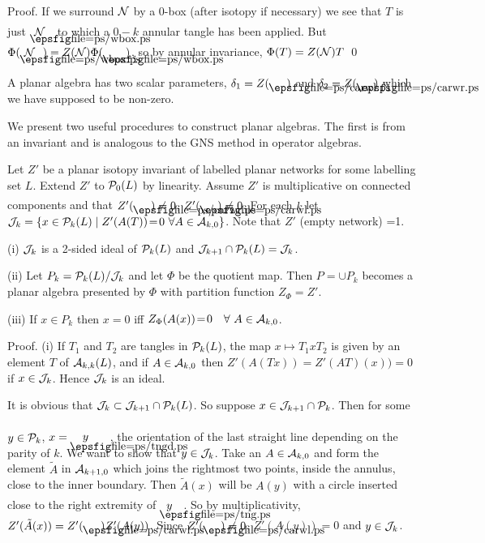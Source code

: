 \bs
{\sc Proof.} If we surround $\cal N$ by a 0-box (after isotopy
if necessary) we see that $T$ is just $\blankbox{\cal N}$ to which
a $0-k$ annular tangle has been applied. But
$\Phi( \blankbox{\cal N})=Z({\cal N})\Phi(\blankbox\ )$,
so by annular invariance, $\Phi(T)=Z({\cal N})T$ \qed

\bs
A planar algebra has two scalar parameters,
$\d_1=Z(\caleft\ )$ and $\d_2=Z(\caright\ )$
which we have supposed to be non-zero.



\bs We present two useful procedures to construct  planar algebras.
The first is from an invariant and is analogous to the GNS method
in operator algebras.

Let $Z'$ be a planar isotopy invariant of labelled planar networks
for some labelling set $L$. Extend $Z'$ to $\P_0(L)$ by linearity.
Assume $Z'$ is multiplicative on connected components and that
$Z'(\caright\ )\neq 0$, $Z'(\caleft\ )\neq 0$.
For each $k$ let ${\cal J}_k=\{x\in \P_k(L)\mid Z'(A(T))\!=\!0
\ \forall A\in{\cal A}_{k,0}\}$. Note that $Z'$ (empty network) =1.

\bs
{} {\rm{(i)}} ${\cal J}_k$ is a 2-sided
ideal of $\P_k(L)$ and ${\cal J}_{k+1}\cap  \P_k(L)={\cal J}_k$.

{\rm{(ii)}} Let $P_k=\P_k(L)/ {\cal J}_k$ and let $\Phi$ be the
quotient map. Then $P=\cup P_k$ becomes a planar algebra presented
by $\Phi$ with partition function $Z_{\Phi}=Z'$.

{\rm{(iii)}} If $x\in P_k$ then $x=0$ iff $Z_{\Phi}(A(x))\!=\!0
\quad\forall \ A\in{\cal A}_{k,0}$.

\bs
{\sc Proof}. (i) If $T_1$ and $T_2$ are tangles in $\P_k(L)$, the
map $x\mapsto T_1x T_2$ is given by an element $T$ of
${\cal A}_{k,k}(L)$, and if $A\in{\cal A}_{k,0}$ then
$Z'(A(Tx))=Z'(AT)(x))=0$ if $x\in{\cal J}_k$. Hence ${\cal J}_k$ is an
ideal.

It is obvious that ${\cal J}_k\subset{\cal J}_{k+1}\cap{\P}_k(L)$.
So suppose  $x\in{\cal J}_{k+1}\cap \P_k$. Then for some $y\in \P_k$,
$x=\tangleudarrow{y}$, the orientation of the
last straight line depending on the parity of $k$. We want to show
that
$y\in{\cal J}_k$. Take an $A\in{\cal A}_{k,0}$ and form the element
$\tilde A$ in ${\cal A}_{k+1,0}$ which joins the rightmost two
points, inside the annulus, close to the inner boundary.
Then $\tilde A(x)$ will be $A(y)$ with a circle inserted close to
the right extremity of  $\tangle{y}$. So by multiplicativity,
$Z'(\tilde A(x))=Z'(\caleft\ )Z'(A(y))$.
Since $Z'(\caleft\ )\neq 0$, $Z'(A(y))=0$ and
$y\in{\cal J}_k$.

